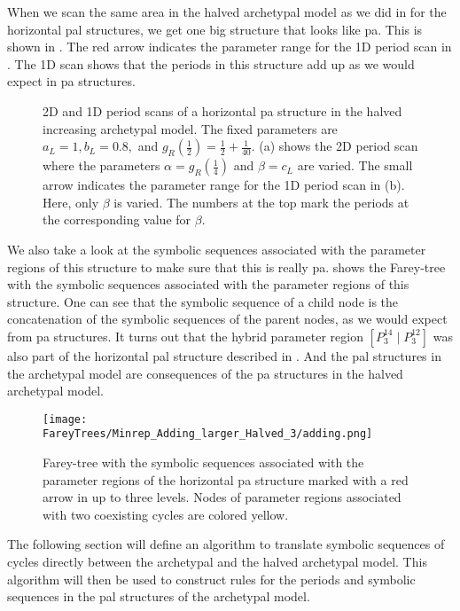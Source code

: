 When we scan the same area in the halved archetypal model as we did in  for the horizontal \gls{pal} structures, we get one big structure that looks like \gls{pa}.
This is shown in .
The red arrow indicates the parameter range for the 1D period scan in .
The 1D scan shows that the periods in this structure add up as we would expect in \gls{pa} structures.

\begin{figure}
	\centering
	\caption[2D and 1D period scans of a horizontal period-adding structure in the halved increasing archetypal model]{
		2D and 1D period scans of a horizontal \gls{pa} structure in the halved increasing archetypal model.
		The fixed parameters are $a_L = 1, b_L = 0.8,$ and $g_R\left(\frac{1}{2}\right) = \frac{1}{2} + \frac{1}{40}$.
		(a) shows the 2D period scan where the parameters $\alpha = g_R\left(\frac{1}{4}\right)$ and $\beta = c_L$ are varied.
		The small arrow indicates the parameter range for the 1D period scan in (b).
		Here, only $\beta$ is varied.
		The numbers at the top mark the periods at the corresponding value for $\beta$.
	}
	\label{fig:add.halved.hor}
\end{figure}

We also take a look at the symbolic sequences associated with the parameter regions of this structure to make sure that this is really \gls{pa}.
 shows the Farey-tree with the symbolic sequences associated with the parameter regions of this structure.
One can see that the symbolic sequence of a child node is the concatenation of the symbolic sequences of the parent nodes, as we would expect from \gls{pa} structures.
It turns out that the hybrid parameter region $\left[P^{14}_3 \mid P^{12}_3\right]$ was also part of the horizontal \gls{pal} structure described in .
And the \gls{pal} structures in the archetypal model are consequences of the \gls{pa} structures in the halved archetypal model.

\begin{figure}
	\centering
	\texttt{[image: FareyTrees/Minrep\_Adding\_larger\_Halved\_3/adding.png]}
	\caption[Farey-tree with the symbolic sequences of a horizontal  structure]{
		Farey-tree with the symbolic sequences associated with the parameter regions of the horizontal \gls{pa} structure marked with a red arrow in  up to three levels.
		Nodes of parameter regions associated with two coexisting cycles are colored yellow.
	}
	\label{fig:halved.hor.tree}
\end{figure}

The following section will define an algorithm to translate symbolic sequences of cycles directly between the archetypal and the halved archetypal model.
This algorithm will then be used to construct rules for the periods and symbolic sequences in the \gls{pal} structures of the archetypal model.
